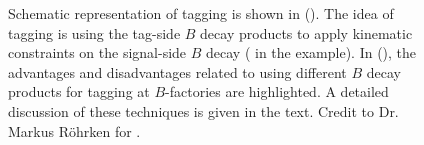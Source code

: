 \begin{figure}[hbtp!]
    \centering
    \subcaptionbox{\label{fig:tagging_schematic}}{
        \resizebox{0.3\textwidth}{!}{
            
            }
    }
    \caption{\label{fig:tagging_drawins} Schematic representation of tagging is shown in ().
    The idea of tagging is using the tag-side $B$ decay products to apply kinematic constraints on the signal-side $B$ decay (\mbox{\BtoXsgamma} in the example).
    In (), the advantages and disadvantages related to using different $B$ decay products for tagging at $B$-factories are highlighted.
    A detailed discussion of these techniques is given in the text.
    Credit to Dr. Markus Röhrken for .}
\end{figure}

